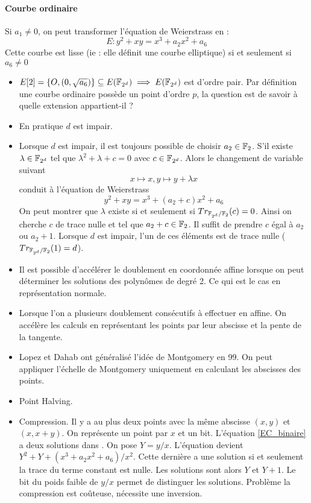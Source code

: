 \documentclass[a4paper]{report}
\begin{document}
\paragraph{Courbe ordinaire}
Si $a_1 \neq 0$, on peut transformer l'équation de Weierstrass en :
\begin{equation}
E : y^2 + xy = x^3 + a_2x^2 + a_6
\end{equation}
Cette courbe est lisse (ie : elle définit une courbe elliptique) si et seulement si $a_6 \neq 0$
\begin{itemize}[label=$\bullet$]
    \item $E[2] = \{ O{}, (0, \sqrt{a_6})\} \subseteq E(\mathbb{F}_{2^d}) \implies E(\mathbb{F}_{2^d})$ est d'ordre pair. Par définition une courbe ordinaire possède un point d'ordre $p$, la question est de savoir à quelle extension appartient-il ?
    \item En pratique $d$ est impair.
    \item Lorsque $d$ est impair, il est toujours possible de choisir $a_2 \in \mathbb{F}_{2}$. S'il existe $\lambda \in \mathbb{F}_{2^d}$ tel que $\lambda^2 + \lambda + c = 0$ avec $c \in \mathbb{F}_{2^d}$. Alors le changement de variable suivant
    \begin{equation*}
    x \mapsto x, y \mapsto y + \lambda x
    \end{equation*}
    conduit à l'équation de Weierstrass 
    \begin{equation}
    y^2 + xy = x^3 + (a_2 + c)x^2 + a_6
    \label{EC_binaire}
    \end{equation}
    On peut montrer que $\lambda$ existe si et seulement si $Tr_{\mathbb{F}_{2^d}/\mathbb{F}_{2}}(c) = 0$. Ainsi on cherche $c$ de trace nulle et tel que $a_2 + c \in \mathbb{F}_{2}$. Il suffit de prendre $c$ égal à $a_2$ ou $a_2 + 1$. Lorsque $d$ est impair, l'un de ces éléments est de trace nulle ($Tr_{\mathbb{F}_{2^d}/\mathbb{F}_{2}}(1) = d$).
    \item Il est possible d'accélérer le doublement en coordonnée affine lorsque on peut déterminer les solutions des polynômes de degré 2. Ce qui est le cas en représentation normale.
    \item Lorsque l'on a plusieurs doublement consécutifs à effectuer en affine. On accélère les calculs en représentant les points par leur abscisse et la pente de la tangente.
    \item Lopez et Dahab ont généralisé l'idée de Montgomery en 99. On peut appliquer l'échelle de Montgomery uniquement en calculant les abscisses des points.
    \item Point Halving.
    \item Compression. Il y a au plus deux points avec la même abscisse $(x,y)$ et $(x,x+y)$. On représente un point par $x$ et un bit. L'équation \eqref{EC_binaire} a deux solutions dans . On pose $Y = y / x$. L'équation devient $Y^2 + Y + (x^3 + a_2x^2 + a_6)/x^2$. Cette dernière a une solution si et seulement la trace du terme constant est nulle. Les solutions sont alors $Y$ et $Y+1$. Le bit du poids faible de $y/x$ permet de distinguer les solutions. Problème la compression est coûteuse, nécessite une inversion.
\end{itemize}
\end{document}
